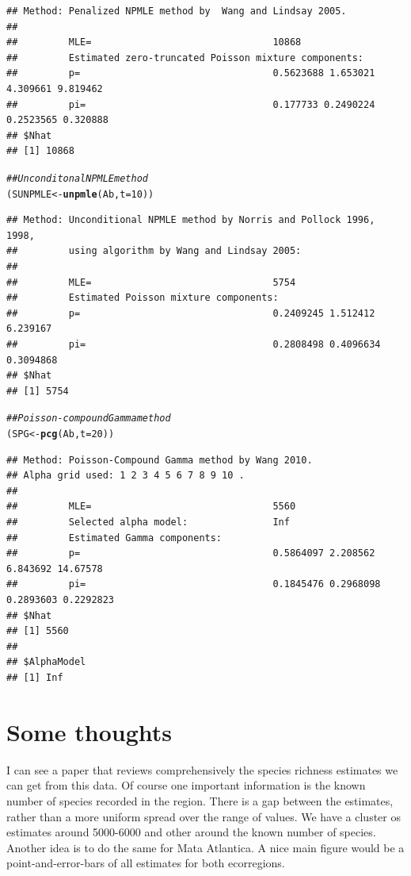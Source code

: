 \documentclass[12pt, A4]{article}\usepackage[]{graphicx}\usepackage[]{color}
\makeatletter
\newcommand{\hlnum}[1]{\textcolor[rgb]{0.686,0.059,0.569}{#1}}%
\newcommand{\hlcom}[1]{\textcolor[rgb]{0.678,0.584,0.686}{\textit{#1}}}%
\newcommand{\hlstd}[1]{\textcolor[rgb]{0.345,0.345,0.345}{#1}}%
\newcommand{\hlkwb}[1]{\textcolor[rgb]{0.69,0.353,0.396}{#1}}%
\newcommand{\hlkwc}[1]{\textcolor[rgb]{0.333,0.667,0.333}{#1}}%
\newcommand{\hlkwd}[1]{\textcolor[rgb]{0.737,0.353,0.396}{\textbf{#1}}}%
\newenvironment{kframe}{%
 \def\at@end@of@kframe{}%
 \ifinner\ifhmode%
  \def\at@end@of@kframe{\end{minipage}}%
  \begin{minipage}{\columnwidth}%
 \fi\fi%
 \def\FrameCommand##1{\hskip\@totalleftmargin \hskip-\fboxsep
 \colorbox{shadecolor}{##1}\hskip-\fboxsep
     \hskip-\linewidth \hskip-\@totalleftmargin \hskip\columnwidth}%
 \MakeFramed {\advance\hsize-\width
   \@totalleftmargin\z@ \linewidth\hsize
   \@setminipage}}%
 {\par\unskip\endMakeFramed%
 \at@end@of@kframe}
\newenvironment{knitrout}{}{} %
\makeatother
\begin{document}
\begin{knitrout}
\begin{kframe}
\begin{alltt}
\end{alltt}
\begin{verbatim}
## Method: Penalized NPMLE method by  Wang and Lindsay 2005. 
## 
##         MLE=                                10868 
##         Estimated zero-truncated Poisson mixture components:       
##         p=                                  0.5623688 1.653021 4.309661 9.819462 
##         pi=                                 0.177733 0.2490224 0.2523565 0.320888
## $Nhat
## [1] 10868
\end{verbatim}
\begin{alltt}
\hlcom{##Unconditonal NPMLE method}
\hlstd{(SUNPMLE} \hlkwb{<-}\hlkwd{unpmle}\hlstd{(Ab,}\hlkwc{t}\hlstd{=}\hlnum{10}\hlstd{))}
\end{alltt}
\begin{verbatim}
## Method: Unconditional NPMLE method by Norris and Pollock 1996, 1998, 
##         using algorithm by Wang and Lindsay 2005: 
## 
##         MLE=                                5754 
##         Estimated Poisson mixture components:       
##         p=                                  0.2409245 1.512412 6.239167 
##         pi=                                 0.2808498 0.4096634 0.3094868
## $Nhat
## [1] 5754
\end{verbatim}
\begin{alltt}
\hlcom{##Poisson-compound Gamma method}
\hlstd{(SPG} \hlkwb{<-} \hlkwd{pcg}\hlstd{(Ab,}\hlkwc{t}\hlstd{=}\hlnum{20}\hlstd{))}
\end{alltt}
\begin{verbatim}
## Method: Poisson-Compound Gamma method by Wang 2010. 
## Alpha grid used: 1 2 3 4 5 6 7 8 9 10 . 
## 
##         MLE=                                5560 
##         Selected alpha model:               Inf 
##         Estimated Gamma components:         
##         p=                                  0.5864097 2.208562 6.843692 14.67578 
##         pi=                                 0.1845476 0.2968098 0.2893603 0.2292823
## $Nhat
## [1] 5560
## 
## $AlphaModel
## [1] Inf
\end{verbatim}
\end{kframe}
\end{knitrout}

\section*{Some  thoughts}

I can see a paper that reviews comprehensively the species richness estimates we can get from this data. Of course one important information is the known number of species recorded in the region. There is a gap between the estimates, rather than a more uniform spread over the range of values. We have a cluster os estimates around 5000-6000 and other around the known number of species. Another idea is to do the same for Mata Atlantica.  A nice main figure would be a point-and-error-bars of all estimates for both ecorregions.
\end{document}
